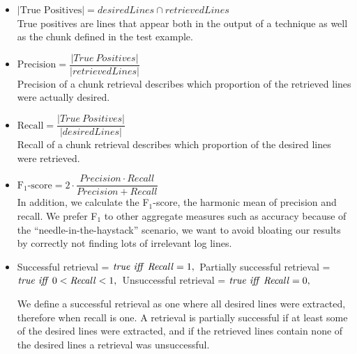 \vspace{0.2cm}
\begin{itemize}[leftmargin=0.4cm] \itemsep1em
	\item $|\mbox{True\ Positives}| = \mathit{desiredLines} \cap
	\mathit{retrievedLines}$ \vspace{0.2cm}\\
	True positives are lines that appear both in the output of a
	technique as well as the chunk defined in the
  test example.


	\item $\mbox{Precision} = \dfrac{|\mathit{True\
	Positives}|}{|\mathit{retrievedLines}|}$ \vspace{0.21cm} \\
	Precision of a chunk retrieval describes which proportion of
	the retrieved lines were actually desired.

	\item $\mbox{Recall} =
	\dfrac{|\mathit{True\ Positives}|}{|\mathit{desiredLines}|}$
	\vspace{0.2cm} \\
	Recall of a chunk retrieval describes which proportion of the
	desired lines were retrieved.

	\item $\mbox{F$_{1}$-score} = 2 \cdot \dfrac{\mathit{Precision}
	\cdot \mathit{Recall}}{\mathit{Precision} + \mathit{Recall}}$
	\vspace{0.2cm}\\
	In addition, we calculate the F$_{1}$-score, the harmonic mean
	of precision and recall.
  We prefer F$_{1}$ to other aggregate
	measures such as accuracy because of the
	``needle-in-the-haystack'' scenario, we want to avoid bloating
	our results by correctly not finding lots of irrelevant log
	lines.

	\item Successful retrieval = $\mathit{true}\ \mathit{iff}\
	\mathit{Recall} = 1, \vspace{0.1cm}\\$
	Partially successful retrieval = $\mathit{true}\ \mathit{iff}\
	0<\mathit{Recall}<1, \vspace{0.1cm}\\$
	Unsuccessful retrieval = $\mathit{true}\ \mathit{iff}\
	\mathit{Recall} = 0, \vspace{0.1cm}$

	We define a successful retrieval as one where all desired
	lines were extracted, therefore when recall is one.
	A retrieval is partially successful if at least some of the
	desired lines were extracted,
	and if the retrieved lines contain none of the desired lines
	a retrieval was unsuccessful.
\end{itemize}
\vspace{0.2cm}

